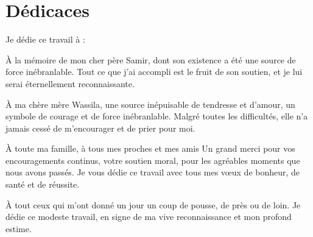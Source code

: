  \chapter*{\Huge Dédicaces}

\begingroup
\begin{center}

    \large \raggedright Je dédie ce travail à :
    \end{center}
    \vspace{4mm}
    \begin{center}
À la mémoire de mon cher père Samir, dont son existence a été une source de force inébranlable. Tout ce que j'ai accompli est le fruit de son soutien, et je lui serai éternellement reconnaissante.\\
  \end{center}
 
 \vspace{4mm}
 \begin{center}
     
À ma chère mère Wassila, une source inépuisable de tendresse et d'amour, un symbole de courage et de force inébranlable. Malgré toutes les difficultés, elle n'a jamais cessé de m'encourager et de prier pour moi. \\
               \end{center}
             
 \vspace{4mm}
 \begin{center}
     
À toute ma famille, à tous mes proches et mes amis Un grand merci pour vos encouragements continus, votre soutien moral, pour les agréables moments que nous avons passés. Je vous dédie ce travail avec tous mes vœux de bonheur, de santé et de réussite.\\
 \end{center}


\begin{center}

À tout ceux qui m’ont donné un jour un coup de pousse, de près ou de loin.
Je dédie ce modeste travail, en signe de ma vive reconnaissance et mon profond
estime.
\end{center}
\endgroup

\vspace{8mm}
